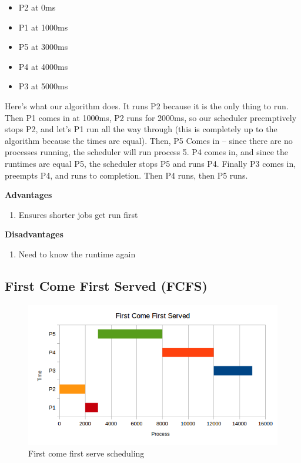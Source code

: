 \begin{itemize}
\tightlist
\item
  P2 at 0ms
\item
  P1 at 1000ms
\item
  P5 at 3000ms
\item
  P4 at 4000ms
\item
  P3 at 5000ms
\end{itemize}

Here's what our algorithm does. It runs P2 because it is the only thing to run. Then P1 comes in at 1000ms, P2 runs for 2000ms, so our scheduler preemptively stops P2, and let's P1 run all the way through (this is completely up to the algorithm because the times are equal). Then, P5 Comes in -- since there are no processes running, the scheduler will run process 5. P4 comes in, and since the runtimes are equal P5, the scheduler stops P5 and runs P4. Finally P3 comes in, preempts P4, and runs to completion. Then P4 runs, then P5 runs.

\textbf{Advantages} 

\begin{enumerate}
  \item Ensures shorter jobs get run first
\end{enumerate}

\textbf{Disadvantages} 

\begin{enumerate}
  \item Need to know the runtime again
\end{enumerate}

\subsection{First Come First Served (FCFS)}

\begin{figure}[htbp]
\centering
\includegraphics[width=\textwidth]{scheduling/images/fcfs.png}
\caption{First come first serve scheduling}
\end{figure}

